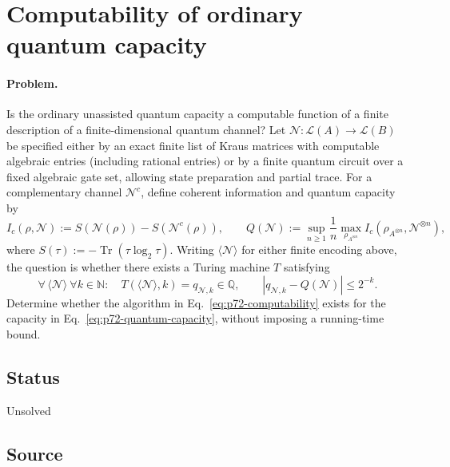 \section{Computability of ordinary quantum capacity}
\label{sec:op_54aa8f0f61ecc5b1}

\paragraph{Problem.}
Is the ordinary unassisted quantum capacity a computable function of a finite
description of a finite-dimensional quantum channel?  Let
$\mathcal N:\mathcal L(A)\to\mathcal L(B)$ be specified either by an exact
finite list of Kraus matrices with computable algebraic entries (including
rational entries) or by a finite quantum circuit over a fixed algebraic gate
set, allowing state preparation and partial trace.  For a complementary
channel $\mathcal N^c$, define coherent information and quantum capacity by
\begin{equation}
  I_c(\rho,\mathcal N)
  :=S(\mathcal N(\rho))-S(\mathcal N^c(\rho)),
  \qquad
  Q(\mathcal N)
  :=\sup_{n\geq1}\frac1n
       \max_{\rho_{A^{\otimes n}}}
       I_c(\rho_{A^{\otimes n}},\mathcal N^{\otimes n}),
  \label{eq:p72-quantum-capacity}
\end{equation}
where $S(\tau):=-\operatorname{Tr}(\tau\log_2\tau)$.  Writing
$\langle\mathcal N\rangle$ for either finite encoding above, the question is
whether there exists a Turing machine $T$ satisfying
\begin{equation}
  \forall\,\langle\mathcal N\rangle\ \forall k\in\mathbb N:
  \quad
  T(\langle\mathcal N\rangle,k)=q_{\mathcal N,k}\in\mathbb Q,
  \qquad
  |q_{\mathcal N,k}-Q(\mathcal N)|\leq2^{-k}.
  \label{eq:p72-computability}
\end{equation}
Determine whether the algorithm in Eq.~\eqref{eq:p72-computability} exists
for the capacity in Eq.~\eqref{eq:p72-quantum-capacity}, without imposing a
running-time bound.

\subsection*{Status}

Unsolved

\subsection*{Source}

